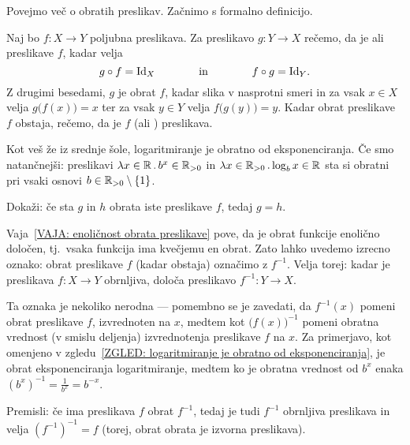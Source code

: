 		Povejmo več o obratih preslikav. Začnimo s formalno definicijo.
		
		\begin{definicija}
			Naj bo $f\colon X \to Y$ poljubna preslikava. Za preslikavo $g\colon Y \to X$ rečemo, da je  ali  preslikave $f$, kadar velja
			\[g \circ f = \id[X] \qquad\qquad \text{in} \qquad\qquad f \circ g = \id[Y].\]
			Z drugimi besedami, $g$ je obrat $f$, kadar slika v nasprotni smeri in za vsak $x \in X$ velja $g\big(f(x)\big) = x$ ter za vsak $y \in Y$ velja $f\big(g(y)\big) = y$. Kadar obrat preslikave $f$ obstaja, rečemo, da je $f$  (ali ) preslikava.
		\end{definicija}
		
		\begin{zgled}\label{ZGLED: logaritmiranje je obratno od eksponenciranja}
			Kot veš že iz srednje šole, logaritmiranje je obratno od eksponenciranja. Če smo natančnejši: preslikavi $\xlam{x}[\RR]{b^x}[\RR_{> 0}]$ in $\xlam{x}[\RR_{>0}]{\log_b x}[\RR]$ sta si obratni pri vsaki osnovi $b \in \RR_{> 0} \setminus \set{1}$.
		\end{zgled}
		
		\begin{vaja}\label{VAJA: enoličnost obrata preslikave}
			Dokaži: če sta $g$ in $h$ obrata iste preslikave $f$, tedaj $g = h$.
		\end{vaja}
		
		Vaja~\ref{VAJA: enoličnost obrata preslikave} pove, da je obrat funkcije enolično določen, tj.~vsaka funkcija ima kvečjemu en obrat. Zato lahko uvedemo izrecno oznako: obrat preslikave $f$ (kadar obstaja) označimo z $f^{-1}$. Velja torej: kadar je preslikava $f\colon X \to Y$ obrnljiva, določa preslikavo $f^{-1}\colon Y \to X$.
		
		Ta oznaka je nekoliko nerodna --- pomembno se je zavedati, da $f^{-1}(x)$ pomeni obrat preslikave $f$, izvrednoten na $x$, medtem kot $\big(f(x)\big)^{-1}$ pomeni obratna vrednost (v smislu deljenja) izvrednotenja preslikave $f$ na $x$. Za primerjavo, kot omenjeno v zgledu~\ref{ZGLED: logaritmiranje je obratno od eksponenciranja}, je obrat eksponenciranja logaritmiranje, medtem ko je obratna vrednost od $b^x$ enaka $(b^x)^{-1} = \frac{1}{b^x} = b^{-x}$.
		
		\begin{vaja}
			Premisli: če ima preslikava $f$ obrat $f^{-1}$, tedaj je tudi $f^{-1}$ obrnljiva preslikava in velja $(f^{-1})^{-1} = f$ (torej, obrat obrata je izvorna preslikava).
		\end{vaja}
		
